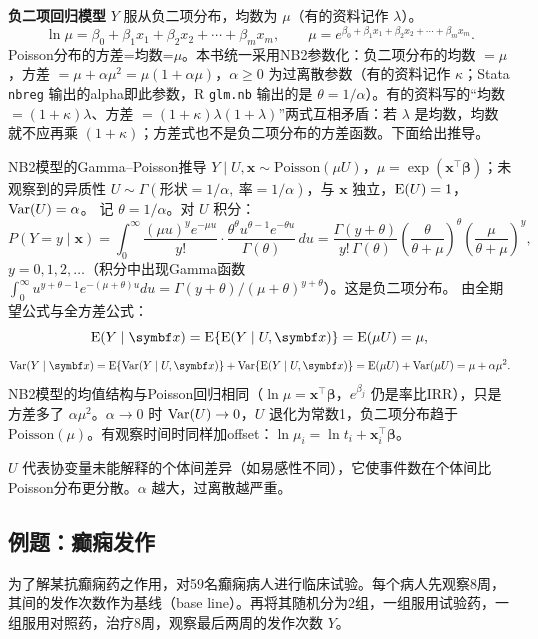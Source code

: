 \textbf{负二项回归模型} $Y$ 服从负二项分布，均数为 $\mu$（有的资料记作 $\lambda$）。
\[
\ln\mu=\beta_0+\beta_1x_1+\beta_2x_2+\cdots+\beta_mx_m,\qquad
\mu=e^{\beta_0+\beta_1x_1+\beta_2x_2+\cdots+\beta_mx_m}.
\]
Poisson分布的方差=均数=$\mu$。本书统一采用NB2参数化：负二项分布的均数 $=\mu$，方差 $=\mu+\alpha\mu^2=\mu(1+\alpha\mu)$，$\alpha\ge0$ 为过离散参数（有的资料记作 $\kappa$；Stata \texttt{nbreg} 输出的alpha即此参数，R \texttt{glm.nb} 输出的是 $\theta=1/\alpha$）。有的资料写的“均数 $=(1+\kappa)\lambda$、方差 $=(1+\kappa)\lambda(1+\lambda)$”两式互相矛盾：若 $\lambda$ 是均数，均数就不应再乘 $(1+\kappa)$；方差式也不是负二项分布的方差函数。下面给出推导。
\begin{derivation}{NB2模型的Gamma--Poisson推导}
$Y\mid U,\bm x\sim\text{Poisson}(\mu U)$，$\mu=\exp(\bm x^\top\bm\beta)$；未观察到的异质性 $U\sim\Gamma(\text{形状}=1/\alpha,\ \text{率}=1/\alpha)$，与 $\bm x$ 独立，$\operatorname{E}(U)=1$，$\operatorname{Var}(U)=\alpha$。
记 $\theta=1/\alpha$。对 $U$ 积分：
\[
P(Y=y\mid\bm x)=\int_0^\infty\frac{(\mu u)^ye^{-\mu u}}{y!}\cdot\frac{\theta^\theta u^{\theta-1}e^{-\theta u}}{\Gamma(\theta)}\,du
=\frac{\Gamma(y+\theta)}{y!\,\Gamma(\theta)}\left(\frac{\theta}{\theta+\mu}\right)^\theta\left(\frac{\mu}{\theta+\mu}\right)^y,
\]
$y=0,1,2,\ldots$（积分中出现Gamma函数 $\int_0^\infty u^{y+\theta-1}e^{-(\mu+\theta)u}du=\Gamma(y+\theta)/(\mu+\theta)^{y+\theta}$）。这是负二项分布。
由全期望公式与全方差公式：
\[
\E(Y\mid\bm x)=\E\{\E(Y\mid U,\bm x)\}=\E(\mu U)=\mu,
\]
\[
\Var(Y\mid\bm x)=\E\{\Var(Y\mid U,\bm x)\}+\Var\{\E(Y\mid U,\bm x)\}=\E(\mu U)+\Var(\mu U)=\mu+\alpha\mu^2 .
\]
NB2模型的均值结构与Poisson回归相同（$\ln\mu=\bm x^\top\bm\beta$，$e^{\beta_j}$ 仍是率比IRR），只是方差多了 $\alpha\mu^2$。$\alpha\to0$ 时 $\operatorname{Var}(U)\to0$，$U$ 退化为常数1，负二项分布趋于 $\text{Poisson}(\mu)$。有观察时间时同样加offset：$\ln\mu_i=\ln t_i+\bm x_i^\top\bm\beta$。
\end{derivation}
\begin{annotation}$U$ 代表协变量未能解释的个体间差异（如易感性不同），它使事件数在个体间比Poisson分布更分散。$\alpha$ 越大，过离散越严重。\end{annotation}
\subsection{例题：癫痫发作}
为了解某抗癫痫药之作用，对59名癫痫病人进行临床试验。每个病人先观察8周，其间的发作次数作为基线（base line）。再将其随机分为2组，一组服用试验药，一组服用对照药，治疗8周，观察最后两周的发作次数 $Y$。

